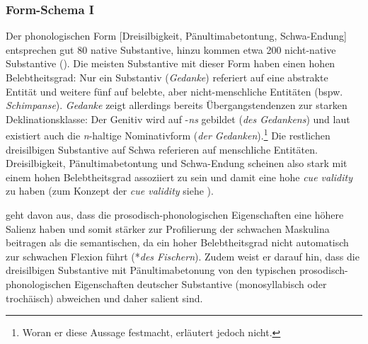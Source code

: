 \subsubsection{Form-Schema I}  \label{sch1}

Der phonologischen Form [Dreisilbigkeit, Pänultimabetontung, Schwa-Endung] entsprechen gut 80 native Substantive, hinzu kommen etwa 200 nicht-native Substantive (\cite[171]{Kopcke.1995}). Die meisten Substantive mit dieser Form haben einen hohen Belebtheitsgrad: Nur ein Substantiv (\textit{Gedanke}) referiert auf eine abstrakte Entität und weitere fünf auf belebte, aber nicht-menschliche Entitäten (bspw. \textit{Schimpanse}). \textit{Gedanke} zeigt allerdings bereits Übergangstendenzen zur starken Deklinationsklasse: Der Genitiv wird auf -\textit{ns} gebildet (\textit{des Gedankens}) und laut \textcite[171]{Kopcke.1995} existiert auch die \textit{n}-haltige Nominativform (\textit{der Gedanken}).\footnote{Woran er diese Aussage festmacht, erläutert \textcite{Kopcke.1995} jedoch nicht.} Die restlichen dreisilbigen Substantive auf Schwa referieren auf menschliche Entitäten. Dreisilbigkeit, Pänultimabetontung und Schwa-Endung scheinen also stark mit einem hohen Belebtheitsgrad assoziiert zu sein und damit eine hohe \textit{cue validity} zu haben (zum Konzept der \textit{cue validity} siehe ). 

 

\textcite[395--396]{Schafer.2019} geht davon aus, dass die prosodisch-phonologischen Eigenschaften eine höhere Salienz haben und somit stärker zur Profilierung der schwachen Maskulina beitragen als die semantischen, da ein hoher Belebtheitsgrad nicht automatisch zur schwachen Flexion führt (*\textit{des Fischern}). Zudem weist er darauf hin, dass die dreisilbigen Substantive mit Pänultimabetonung von den typischen prosodisch-phonologischen Eigenschaften deutscher Substantive (monosyllabisch oder trochäisch) abweichen und daher salient sind. 

